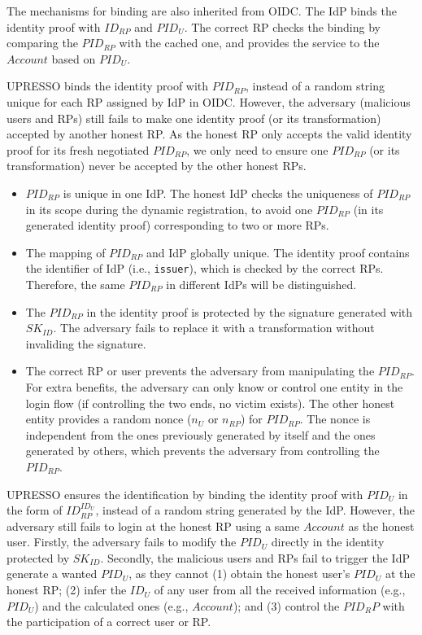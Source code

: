 The mechanisms for binding are also inherited from OIDC. The IdP binds the identity proof with $ID_{RP}$ and $PID_{U}$. The correct RP checks the binding by comparing the $PID_{RP}$ with the cached one, and provides the service  to the $Account$ based on $PID_U$.

UPRESSO binds the identity proof with $PID_{RP}$, instead of a random string unique for each RP assigned by IdP in OIDC. However, the adversary (malicious users and RPs) still fails to  make one identity proof (or its transformation) accepted by another honest RP. As the honest RP only accepts the valid identity proof for its fresh negotiated $PID_{RP}$, we only need to ensure one $PID_{RP}$ (or its transformation) never be accepted by the other honest RPs.
\begin{itemize}
\item $PID_{RP}$ is unique in one IdP. The honest IdP checks the uniqueness of $PID_{RP}$ in its scope during the dynamic registration, to avoid one $PID_{RP}$ (in its generated identity proof) corresponding to two or more RPs.
\item The mapping of $PID_{RP}$ and IdP globally unique. The identity proof contains the identifier of IdP (i.e., \verb+issuer+), which is checked by the correct RPs. Therefore, the same $PID_{RP}$ in different IdPs will be distinguished.
\item The $PID_{RP}$ in the identity proof is protected by the signature generated with $SK_{ID}$. The adversary fails to replace it with a transformation without invaliding the signature.
\item The correct RP or user prevents the adversary from manipulating the $PID_{RP}$. For extra benefits, the adversary can only know or control one entity in the login flow (if controlling the two ends, no victim exists). The other honest entity provides a random nonce ($n_U$ or $n_{RP}$) for $PID_{RP}$. The nonce is independent from the ones previously generated by itself  and the ones generated by others, which prevents the adversary from controlling the $PID_{RP}$.

\end{itemize}

UPRESSO ensures the identification by binding the identity proof with $PID_U$  in the form of $ID_{RP}^{ID_U}$, instead of a random string generated by the IdP. However, the adversary still fails to login at the honest RP using a same $Account$ as the honest user. Firstly, the adversary fails to  modify the $PID_U$ directly in the identity protected by $SK_{ID}$. Secondly, the malicious users and RPs fail to trigger the IdP generate a wanted $PID_U$, as they cannot (1) obtain the honest user's $PID_U$ at the honest RP; (2) infer the $ID_U$ of any user from all the received  information (e.g., $PID_U$) and the calculated ones (e.g., $Account$); and (3) control the $PID_RP$ with the participation of a correct user or RP.

